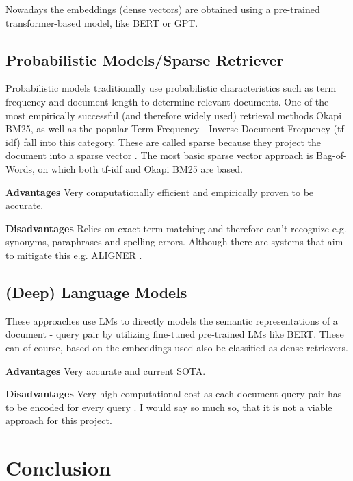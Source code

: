 \documentclass[10pt,twocolumn,letterpaper]{article}
\begin{document}
	Nowadays the embeddings (dense vectors) are obtained using a pre-trained transformer-based model, like BERT or GPT.
	
	\subsection{Probabilistic Models/Sparse Retriever}
	
	Probabilistic models traditionally use probabilistic characteristics such as term frequency and document length to determine relevant documents. One of the most empirically successful (and therefore widely used) retrieval methods Okapi BM25, as well as the popular Term Frequency - Inverse Document Frequency (tf-idf) fall into this category. These are called sparse because they project the document into a sparse vector \citep{zhu2021retrieving}. The most basic sparse vector approach is Bag-of-Words, on which both tf-idf and Okapi BM25 are based.
	
	\textbf{Advantages} Very computationally efficient and empirically proven to be accurate.
	
	\textbf{Disadvantages} Relies on exact term matching and therefore can't recognize e.g. synonyms, paraphrases and spelling errors. Although there are systems that aim to mitigate this e.g. ALIGNER \citep{qian2022multivector}.
	
	\subsection{(Deep) Language Models}
	
	These approaches use LMs to directly models the semantic representations of a document - query pair by utilizing fine-tuned pre-trained LMs like BERT. These can of course, based on the embeddings used also be classified as dense retrievers. \citep{khattab2020colbert}
	
	\textbf{Advantages} Very accurate and current SOTA.
	
	\textbf{Disadvantages} Very high computational cost as each document-query pair has to be encoded for every query \citep{khattab2020colbert}. I would say so much so, that it is not a viable approach for this project.
	
	
	\section*{Conclusion}
	
	
	
\end{document}
